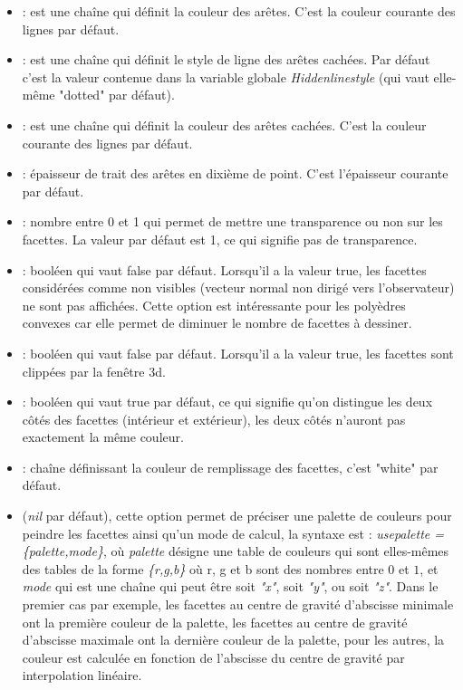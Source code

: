 \begin{enumerate}
\begin{itemize}
        \item {} : est une chaîne qui définit la couleur des arêtes. C'est la couleur courante des lignes par défaut.
        \item {} : est une chaîne qui définit le style de ligne des arêtes cachées. Par défaut c'est la valeur contenue dans la variable globale \emph{Hiddenlinestyle} (qui vaut elle-même "dotted" par défaut).
        \item {} : est une chaîne qui définit la couleur des arêtes cachées. C'est la couleur courante des lignes par défaut.
        \item {} : épaisseur de trait des arêtes en dixième de point. C'est l'épaisseur courante par défaut.
        \item {} : nombre entre 0 et 1 qui permet de mettre une transparence ou non sur les facettes. La valeur par défaut est 1, ce qui signifie pas de transparence.
        \item {} : booléen qui vaut false par défaut. Lorsqu'il a la valeur true, les facettes considérées comme non visibles (vecteur normal non dirigé vers l'observateur) ne sont pas affichées. Cette option est intéressante pour les polyèdres convexes car elle permet de diminuer le nombre de facettes à dessiner.
        \item {} : booléen qui vaut false par défaut. Lorsqu'il a la valeur true, les facettes sont clippées par la fenêtre 3d.
        \item {} : booléen qui vaut true par défaut, ce qui signifie qu'on distingue les deux côtés des facettes (intérieur et extérieur), les deux côtés n'auront pas exactement la même couleur.
        \item {} : chaîne définissant la couleur de remplissage des facettes, c'est "white" par défaut.
        \item {} (\emph{nil} par défaut), cette option permet de préciser une palette de couleurs pour peindre les facettes ainsi qu'un mode de calcul, la syntaxe est : \emph{usepalette = \{palette,mode\}}, où \emph{palette} désigne une table de couleurs qui sont elles-mêmes des tables de la forme \emph{\{r,g,b\}} où r, g et b sont des nombres entre $0$ et $1$, et \emph{mode} qui est une chaîne qui peut être soit \emph{"x"}, soit \emph{"y"}, ou soit \emph{"z"}. Dans le premier cas par exemple, les facettes au centre de gravité d'abscisse minimale ont la première couleur de la palette, les facettes au centre de gravité d'abscisse maximale ont la dernière couleur de la palette, pour les autres, la couleur est calculée en fonction de l'abscisse du centre de gravité par interpolation linéaire.

\end{itemize}
\end{enumerate}
